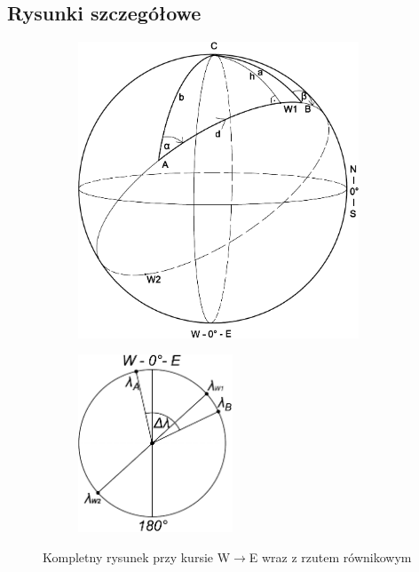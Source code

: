 \documentclass[10pt, twoside, fleqn]{article}
\begin{document}
		\newpage
		
\subsection{Rysunki szczegółowe}	

					\vspace{25pt}
							
					\begin{figure}[h!]
						\centering
						\begin{subfigure}{.5\textwidth}
  							\begin{flushleft}
  							\includegraphics[height=250pt]
  											{katy_WE.pdf}
  							\end{flushleft}
						\end{subfigure}%
						\begin{subfigure}{.5\textwidth}
						  	\begin{flushright}
  							\includegraphics[height=150pt]
  											{rzut_rownik_WE.pdf}							
  							\end{flushright}
						\end{subfigure}
						 \caption{Kompletny rysunek przy
  								  kursie W$\longrightarrow$E wraz z
  								  rzutem równikowym}
  						 \label{fig:w-e}
					\end{figure}	
						
\end{document}
